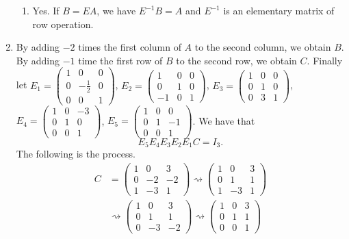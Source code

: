 \begin{enumerate}
\begin{enumerate}
\item Yes. If $B=EA$, we have $E^{-1}B=A$ and $E^{-1}$ is an elementary matrix of row operation.
\end{enumerate}
\item By adding $-2$ times the first column of $A$ to the second column, we obtain $B$. By adding $-1$ time the first row of $B$ to the second row, we obtain $C$. Finally let $E_1=\left(\begin{array}{ccc}1&0&0\\0&-\frac{1}{2}&0\\0&0&1\end{array}\right)$, $E_2=\left(\begin{array}{ccc}1&0&0\\0&1&0\\-1&0&1\end{array}\right)$, $E_3=\left(\begin{array}{ccc}1&0&0\\0&1&0\\0&3&1\end{array}\right)$, $E_4=\left(\begin{array}{ccc}1&0&-3\\0&1&0\\0&0&1\end{array}\right)$, $E_5=\left(\begin{array}{ccc}1&0&0\\0&1&-1\\0&0&1\end{array}\right)$. We have that 
\[E_5E_4E_3E_2E_1C=I_3.\]
The following is the process.
\begin{align*}
C&=\left(\begin{array}{ccc}1&0&3\\0&-2&-2\\1&-3&1\end{array}\right)\rightsquigarrow\left(\begin{array}{ccc}1&0&3\\0&1&1\\1&-3&1\end{array}\right)\\
&\rightsquigarrow\left(\begin{array}{ccc}1&0&3\\0&1&1\\0&-3&-2\end{array}\right)\rightsquigarrow\left(\begin{array}{ccc}1&0&3\\0&1&1\\0&0&1\end{array}\right)\\

\end{align*}
\end{enumerate}
